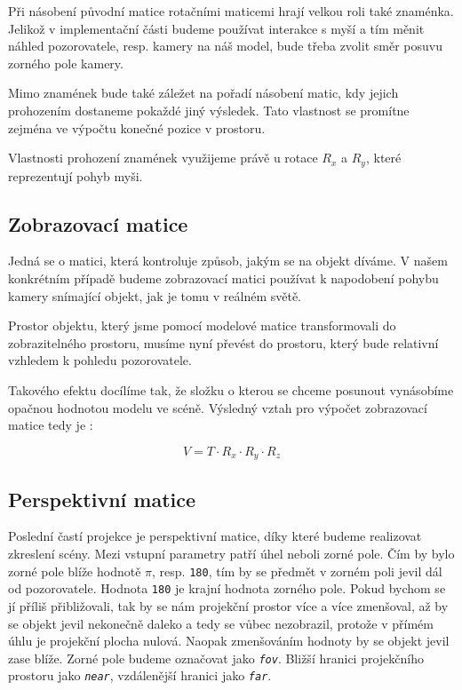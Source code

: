 Při násobení původní matice rotačními maticemi hrají  velkou roli také znaménka. Jelikož v implementační části budeme používat interakce s myší a tím měnit náhled pozorovatele, resp. kamery na náš model, bude třeba zvolit směr posuvu zorného pole kamery. 

Mimo znamének bude také záležet na pořadí násobení matic, kdy jejich prohozením dostaneme pokaždé jiný výsledek. \cite{PaulBourke} Tato vlastnost se promítne zejména ve výpočtu konečné pozice v prostoru.

Vlastnosti prohození znamének využijeme právě u  rotace $R_{x}$ a $R_{y}$, které reprezentují pohyb myši.  




\subsection{Zobrazovací matice}
Jedná se o matici, která kontroluje způsob, jakým se na objekt díváme. V našem konkrétním případě budeme zobrazovací matici používat k napodobení pohybu kamery snímající objekt, jak je tomu v reálném světě. 

Prostor objektu, který jsme pomocí modelové matice transformovali do zobrazitelného prostoru, musíme nyní převést do prostoru, který bude relativní vzhledem k pohledu pozorovatele.

Takového efektu docílíme tak, že složku o kterou se chceme posunout vynásobíme opačnou hodnotou modelu ve scéně. Výsledný vztah pro výpočet zobrazovací matice tedy je \cite{WebGLbeg}:

$$ V = T \cdot R_{x} \cdot R_{y} \cdot R_{z} $$ 

\newpage


\subsection{Perspektivní matice}
Poslední častí projekce je perspektivní matice, díky které budeme realizovat zkreslení scény. Mezi vstupní parametry patří úhel neboli zorné pole. Čím by bylo zorné pole blíže hodnotě $\pi$, resp. \texttt{180\degree}, tím by se předmět v zorném poli jevil dál od pozorovatele. \cite{webglFUND} Hodnota \texttt{180\degree} je krajní hodnota zorného pole. Pokud bychom se jí příliš přibližovali, tak by se nám projekční prostor více a více zmenšoval, až by se objekt jevil nekonečně daleko a tedy se vůbec nezobrazil, protože v přímém úhlu je projekční plocha nulová.  Naopak zmenšováním hodnoty by se objekt jevil zase blíže. Zorné pole budeme označovat jako \texttt{\textit{fov}}. Bližší hranici projekčního prostoru jako \texttt{\textit{near}}, vzdálenější hranici jako \texttt{\textit{far}}.



